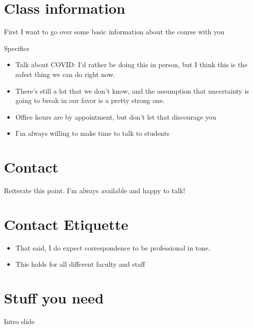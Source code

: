 \documentclass[
  12pt,
]{article}
\begin{document}
\hypertarget{class-information}{%
\section{Class information}\label{class-information}}

First I want to go over some basic information about the course with you

Specifics

\begin{itemize}
\item
  Talk about COVID: I'd rather be doing this in person, but I think this
  is the safest thing we can do right now.
\item
  There's still a lot that we don't know, and the assumption that
  uncertainty is going to break in our favor is a pretty strong one.
\item
  Office hours are by appointment, but don't let that discourage you
\item
  I'm always willing to make time to talk to students
\end{itemize}

\hypertarget{contact}{%
\section{Contact}\label{contact}}

Reiterate this point. I'm always available and happy to talk!

\hypertarget{contact-etiquette}{%
\section{Contact Etiquette}\label{contact-etiquette}}

\begin{itemize}
\item
  That said, I do expect correspondence to be professional in tone.
\item
  This holds for all different faculty and staff
\end{itemize}

\hypertarget{stuff-you-need}{%
\section{Stuff you need}\label{stuff-you-need}}

Intro slide
\end{document}
